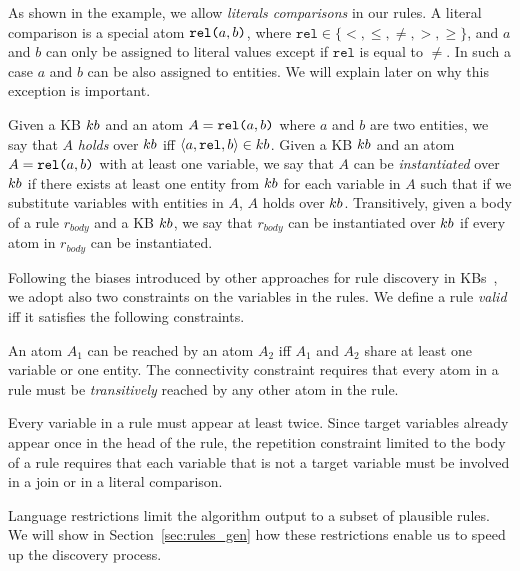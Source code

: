 As shown in the example, we allow \emph{literals comparisons} in our rules. A literal comparison is a special atom $\texttt{rel(}a,b\texttt{)}$, where $\texttt{rel} \in \{<,\leq,\neq,>,\geq\}$, and $a$ and $b$ can only be assigned to literal values except if $\texttt{rel}$ is equal to $\neq$. In such a case $a$ and $b$ can be also assigned to entities. We will explain later on why this exception is important.

Given a KB ${\sc kb}$ and an atom $A=\texttt{rel(}a,b\texttt{)}$ where $a$ and $b$ are two entities, we say that $A$ \emph{holds} over ${\sc kb}$ iff $\langle a,\texttt{rel},b\rangle \in {\sc kb}$.
Given a KB ${\sc kb}$ and an atom $A=\texttt{rel(}a,b\texttt{)}$ with at least one variable, we say that $A$ can be \emph{instantiated} over ${\sc kb}$ if there exists at least one entity from ${\sc kb}$ for each variable in $A$ such that if we substitute variables with entities in $A$, $A$ holds over ${\sc kb}$. Transitively, given a body of a rule $r_{body}$ and a KB ${\sc kb}$, we say that $r_{body}$ can be instantiated over ${\sc kb}$ if every atom in $r_{body}$ can be instantiated. 

Following the biases introduced by other approaches for rule discovery in KBs~\cite{galarraga2015fast,Chen:2016}, we adopt also two constraints on the variables in the rules.
We define a rule \emph{valid} iff it satisfies the following constraints.

\vspace{1ex}
 An atom $A_1$ can be reached by an atom $A_2$ iff $A_1$ and $A_2$ share at least one variable or one entity. The connectivity constraint requires that every atom in a rule must be \emph{transitively} reached by any other atom in the rule.

\vspace{1ex}
 Every variable in a rule must appear at least twice. Since target variables already appear once in the head of the rule, the repetition constraint limited to the body of a rule requires that each variable that is not a target variable must be involved in a join or in a literal comparison.

Language restrictions limit the algorithm output 
to a subset of plausible rules. We will show in Section~\ref{sec:rules_gen} how these restrictions enable us to speed up the discovery process. %

